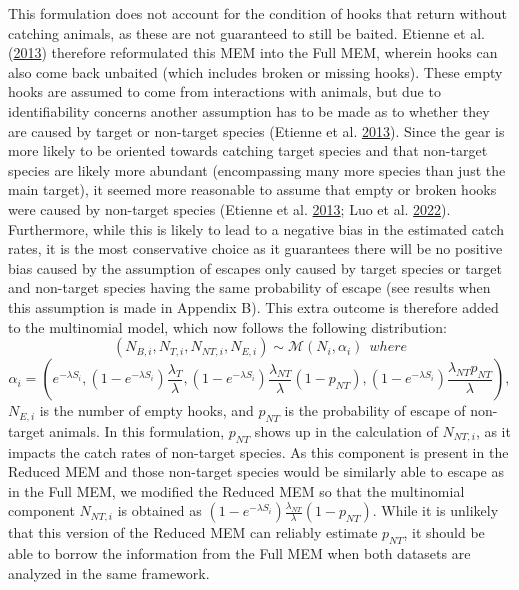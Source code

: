 \documentclass[12pt]{article}\usepackage[]{graphicx}\usepackage[]{color}
\begin{document}
This formulation does not account for the condition of hooks that return without catching animals, as these are not guaranteed to still be baited. Etienne et al. (\protect\hyperlink{ref-Etienne2013}{2013}) therefore reformulated this MEM into the Full MEM, wherein hooks can also come back unbaited (which includes broken or missing hooks). These empty hooks are assumed to come from interactions with animals, but due to identifiability concerns another assumption has to be made as to whether they are caused by target or non-target species (Etienne et al. \protect\hyperlink{ref-Etienne2013}{2013}). Since the gear is more likely to be oriented towards catching target species and that non-target species are likely more abundant (encompassing many more species than just the main target), it seemed more reasonable to assume that empty or broken hooks were caused by non-target species (Etienne et al. \protect\hyperlink{ref-Etienne2013}{2013}; Luo et al. \protect\hyperlink{ref-Luo2022}{2022}). Furthermore, while this is likely to lead to a negative bias in the estimated catch rates, it is the most conservative choice as it guarantees there will be no positive bias caused by the assumption of escapes only caused by target species or target and non-target species having the same probability of escape (see results when this assumption is made in Appendix B). This extra outcome is therefore added to the multinomial model, which now follows the following distribution:
\begin{equation}
(N_{B,i},N_{T,i},N_{NT,i},N_{E,i}) \sim \mathcal{M}(N_i,\alpha_i) \ \ where
\end{equation} \begin{equation}
\alpha_i = (e^{-\lambda S_i},(1-e^{-\lambda S_i})\frac{\lambda_T}{\lambda},(1-e^{-\lambda S_i})\frac{\lambda_{NT}}{\lambda}(1-p_{NT}),(1-e^{-\lambda S_i})\frac{\lambda_{NT}p_{NT}}{\lambda}),
\end{equation}
\(N_{E,i}\) is the number of empty hooks, and \(p_{NT}\) is the probability of escape of non-target animals. In this formulation, \(p_{NT}\) shows up in the calculation of \(N_{NT,i}\), as it impacts the catch rates of non-target species. As this component is present in the Reduced MEM and those non-target species would be similarly able to escape as in the Full MEM, we modified the Reduced MEM so that the multinomial component \(N_{NT,i}\) is obtained as \((1-e^{-\lambda S_i})\frac{\lambda_{NT}}{\lambda}(1-p_{NT})\). While it is unlikely that this version of the Reduced MEM can reliably estimate \(p_{NT}\), it should be able to borrow the information from the Full MEM when both datasets are analyzed in the same framework.
\end{document}
